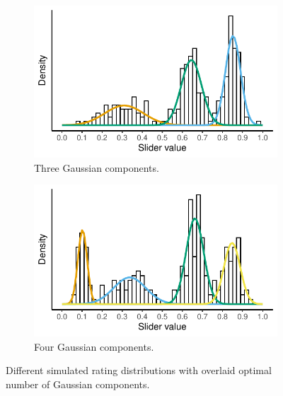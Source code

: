 \documentclass{language}
\newcommand{\6}{\mbox{$[\hspace*{-.6mm}[$}}
\newcommand{\9}{\mbox{$]\hspace*{-.6mm}]$}}
\begin{document}
\begin{figure}[h!]
\begin{subfigure}{.4\textwidth}
\includegraphics[width=\textwidth]{Language-figures/color/Figure18e}
\caption{Three Gaussian components.}
\label{fig:reveal}
\end{subfigure} 
\begin{subfigure}{.4\textwidth}
\includegraphics[width=\textwidth]{Language-figures/color/Figure18f}
\caption{Four Gaussian components.}
\label{fig:reveal}
\end{subfigure}
\caption{Different simulated rating distributions with overlaid optimal number of Gaussian components.}
\label{fig:mixtures}
\end{figure}
\end{document}
